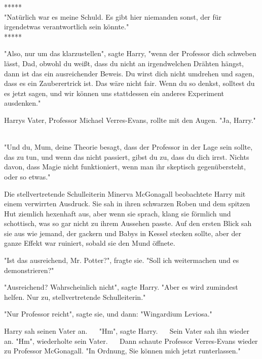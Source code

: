 

\hypertarget{alles-was-ich-glaubte-ist-falsch.}{%

*****\\ "Natürlich war es meine Schuld. Es gibt hier niemanden sonst, der für irgendetwas verantwortlich sein könnte." ~ ~\\ *****

"Also, nur um das klarzustellen", sagte Harry, "wenn der Professor dich schweben lässt, Dad, obwohl du weißt, dass du nicht an irgendwelchen Drähten hängst, dann ist das ein ausreichender Beweis. Du wirst dich nicht umdrehen und sagen, dass es ein Zauberertrick ist. Das wäre nicht fair. Wenn du so denkst, solltest du es jetzt sagen, und wir können uns stattdessen ein anderes Experiment ausdenken." ~ ~

Harrys Vater, Professor Michael Verres-Evans, rollte mit den Augen. "Ja, Harry." ~

"Und du, Mum, deine Theorie besagt, dass der Professor in der Lage sein sollte, das zu tun, und wenn das nicht passiert, gibst du zu, dass du dich irrst. Nichts davon, dass Magie nicht funktioniert, wenn man ihr skeptisch gegenübersteht, oder so etwas."

Die stellvertretende Schulleiterin Minerva McGonagall beobachtete Harry mit einem verwirrten Ausdruck. Sie sah in ihren schwarzen Roben und dem spitzen Hut ziemlich hexenhaft aus, aber wenn sie sprach, klang sie förmlich und schottisch, was so gar nicht zu ihrem Aussehen passte. Auf den ersten Blick sah sie aus wie jemand, der gackern und Babys in Kessel stecken sollte, aber der ganze Effekt war ruiniert, sobald sie den Mund öffnete.

"Ist das ausreichend, Mr. Potter?", fragte sie. "Soll ich weitermachen und es demonstrieren?" ~ ~

"Ausreichend? Wahrscheinlich nicht", sagte Harry. "Aber es wird zumindest helfen. Nur zu, stellvertretende Schulleiterin."

"Nur Professor reicht", sagte sie, und dann: "Wingardium Leviosa." ~ ~

Harry sah seinen Vater an. ~ ~"Hm", sagte Harry. ~ ~Sein Vater sah ihn wieder an. "Hm", wiederholte sein Vater. ~ ~Dann schaute Professor Verres-Evans wieder zu Professor McGonagall. "In Ordnung, Sie können mich jetzt runterlassen." ~ ~

}
